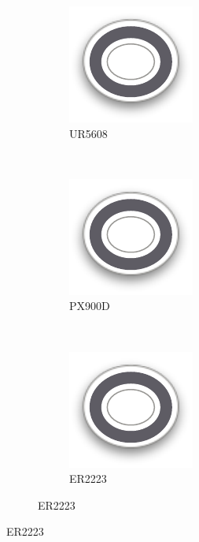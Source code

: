 \documentclass[conference]{IEEEtran}
\begin{document}
\begin{figure}
  \centering
  \begin{subfigure}{\textwidth}
    \begin{subfigure}{0.3\textwidth}
      \centering
      \includegraphics{figures/toroid.pdf}
      \caption{UR5608}
    \end{subfigure}~
    \begin{subfigure}{0.3\textwidth}
      \centering
      \includegraphics{figures/toroid.pdf}
      \caption{PX900D}
    \end{subfigure}~
    \begin{subfigure}{0.3\textwidth}
      \centering
      \includegraphics{figures/toroid.pdf}
      \caption{ER2223}
    \end{subfigure}


\end{subfigure}
\end{figure}
\end{document}
